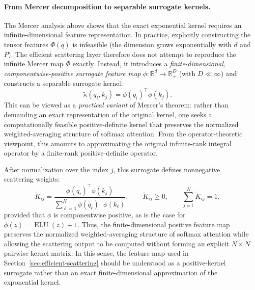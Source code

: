 \documentclass{article}
\newcommand{\R}{\mathbb{R}}
\newcommand{\ELU}{\operatorname{ELU}}
\begin{document}
\paragraph{From Mercer decomposition to separable surrogate kernels.}
The Mercer analysis above shows that the exact exponential kernel requires an infinite-dimensional feature representation. In practice, explicitly constructing the tensor features $\Phi(q)$ is infeasible (the dimension grows exponentially with $d$ and $P$). The efficient scattering layer therefore does not attempt to reproduce the infinite Mercer map $\Phi$ exactly. Instead, it introduces a \emph{finite-dimensional, componentwise-positive surrogate feature map} $\phi:\R^d\to\R^D_+$ (with $D\ll\infty$) and constructs a separable surrogate kernel:
\begin{equation}
    \widetilde\kappa(q_i,k_j)
    =
    \phi(q_i)^\top \phi(k_j).
    \label{eq:app-separable-surrogate}
\end{equation}
This can be viewed as a \emph{practical variant} of Mercer's theorem: rather than demanding an exact representation of the original kernel, one seeks a computationally feasible positive-definite kernel that preserves the normalized weighted-averaging structure of softmax attention. From the operator-theoretic viewpoint, this amounts to approximating the original infinite-rank integral operator by a finite-rank positive-definite operator.

After normalization over the index $j$, this surrogate defines nonnegative scattering weights:
\begin{equation}
    \widetilde K_{ij}
    =
    \frac{
    \phi(q_i)^\top\phi(k_j)
    }{
    \sum_{\ell=1}^{N}\phi(q_i)^\top\phi(k_\ell)
    },
    \qquad
    \widetilde K_{ij}\geq 0,
    \qquad
    \sum_{j=1}^{N}\widetilde K_{ij}=1,
\end{equation}
provided that $\phi$ is componentwise positive, as is the case for $\phi(z)=\ELU(z)+1$. 
Thus, the finite-dimensional positive feature map preserves the normalized weighted-averaging structure of softmax attention while allowing the scattering output to be computed without forming an explicit $N\times N$ pairwise kernel matrix. 
In this sense, the feature map used in Section~\ref{sec:efficient-scattering} should be understood as a positive-kernel surrogate rather than an exact finite-dimensional approximation of the exponential kernel.


 

\end{document}
